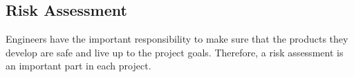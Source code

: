 \documentclass[../report.tex]{subfiles}
\begin{document}
\subsection{Risk Assessment}
Engineers have the important responsibility to make sure that the products
they develop are safe and live up to the project goals. Therefore, a
risk assessment is an important part in each project.
\end{document}
